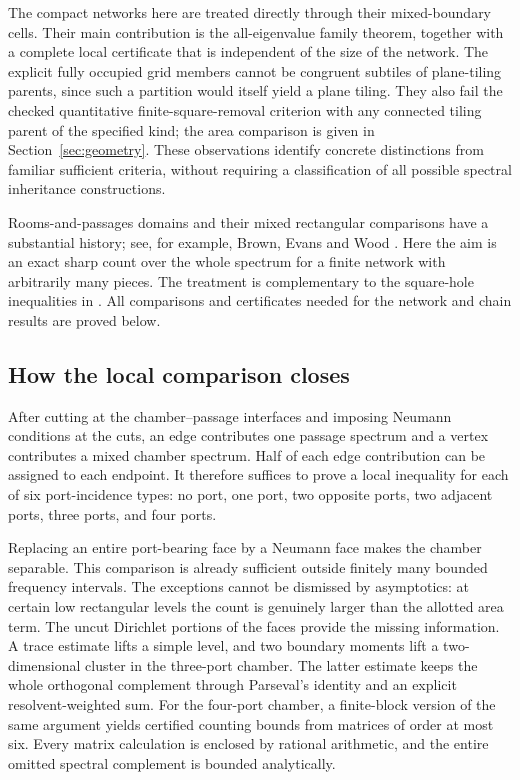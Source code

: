 \documentclass[11pt,reqno]{amsart}
\numberwithin{equation}{section}
\begin{document}
The compact networks here are treated directly through their
mixed-boundary cells. Their main contribution is the all-eigenvalue
family theorem, together with a complete local certificate that is
independent of the size of the network. The explicit fully occupied grid
members cannot be congruent subtiles of plane-tiling parents, since
such a partition would itself yield a plane tiling. They also fail
the checked quantitative finite-square-removal criterion with any
connected tiling parent of the specified kind; the area comparison is given in
Section~\ref{sec:geometry}. These observations identify concrete
distinctions from familiar sufficient criteria, without requiring a
classification of all possible spectral inheritance constructions.

Rooms-and-passages domains and their mixed rectangular comparisons
have a substantial history; see, for example, Brown, Evans and Wood
\cite{BrownEvansWood}. Here the aim is an exact sharp count over the
whole spectrum for a finite network with arbitrarily many pieces.
The treatment is complementary to the square-hole inequalities
in \cite{PLPP}. All comparisons and certificates needed for the
network and chain results are proved below.

\subsection*{How the local comparison closes}

After cutting at the chamber--passage interfaces and imposing
Neumann conditions at the cuts, an edge contributes one passage
spectrum and a vertex contributes a mixed chamber spectrum. Half
of each edge contribution can be assigned to each endpoint. It
therefore suffices to prove a local inequality for each of six
port-incidence types: no port, one port, two opposite ports, two
adjacent ports, three ports, and four ports.

Replacing an entire port-bearing face by a Neumann face makes the
chamber separable. This comparison is already sufficient outside
finitely many bounded frequency intervals. The exceptions cannot be dismissed by asymptotics:
at certain low rectangular levels the count is genuinely larger than
the allotted area term. The uncut Dirichlet portions of the faces
provide the missing information. A trace estimate lifts a simple
level, and two boundary moments lift a two-dimensional cluster in
the three-port chamber. The latter estimate keeps the whole
orthogonal complement through Parseval's identity and an explicit
resolvent-weighted sum. For the four-port chamber, a finite-block
version of the same argument yields certified counting bounds from
matrices of order at most six. Every matrix calculation is enclosed
by rational arithmetic, and the entire omitted spectral complement
is bounded analytically.
\end{document}
